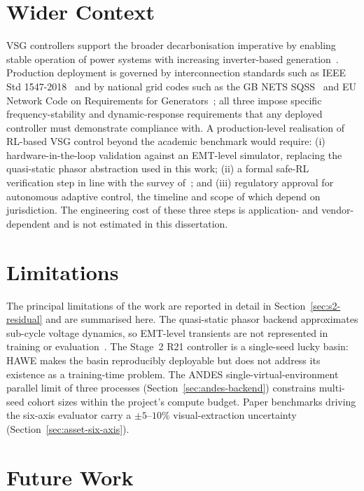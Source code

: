 \documentclass{unnc-fyp}
\begin{document}
\section{Wider Context}

VSG controllers support the broader decarbonisation imperative
by enabling stable operation of power systems with increasing
inverter-based generation~\cite{ipcc_ar6_2022,iea_renewables_2024}.
Production deployment is governed by interconnection standards
such as IEEE Std 1547-2018~\cite{ieee1547} and by national grid
codes such as the GB NETS SQSS~\cite{nationalgrid_sqss} and EU
Network Code on Requirements for Generators~\cite{entsoe_rfg};
all three impose specific frequency-stability and dynamic-response
requirements that any deployed controller must demonstrate
compliance with.
A production-level realisation of RL-based VSG control beyond the
academic benchmark would require: (i) hardware-in-the-loop
validation against an EMT-level simulator, replacing the
quasi-static phasor abstraction used in this work; (ii) a
formal safe-RL verification step in line with the survey
of~\cite{garcia2015safe}; and (iii) regulatory approval for
autonomous adaptive control, the timeline and scope of which
depend on jurisdiction.
The engineering cost of these three steps is application- and
vendor-dependent and is not estimated in this dissertation.

\section{Limitations}

The principal limitations of the work are reported in detail in
Section~\ref{sec:s2-residual} and are summarised here.
The quasi-static phasor backend approximates sub-cycle voltage
dynamics, so EMT-level transients are not represented in
training or evaluation~\cite{milano2018foundations,milano2020frequency}.
The Stage~2 R21 controller is a single-seed lucky basin: HAWE
makes the basin reproducibly deployable but does not address its
existence as a training-time problem.
The ANDES single-virtual-environment parallel limit of three
processes (Section~\ref{sec:andes-backend}) constrains
multi-seed cohort sizes within the project's compute budget.
Paper benchmarks driving the six-axis evaluator carry a
$\pm 5$--$10\%$ visual-extraction uncertainty
(Section~\ref{sec:asset-six-axis}).

\section{Future Work}
\end{document}
